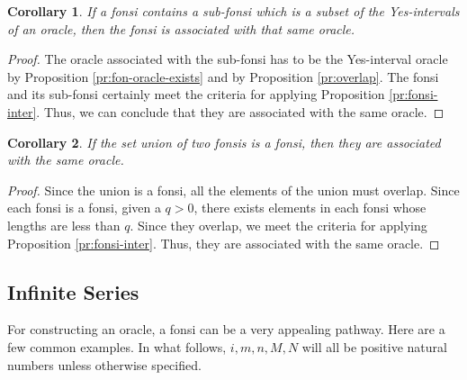 \documentclass[12pt]{article}
\newtheorem{corollary}{Corollary}[subsection]
\begin{document}
\begin{corollary}\label{cor:sub-fonsi}
    If a fonsi contains a sub-fonsi which is a subset of the Yes-intervals of an oracle, then the fonsi is associated with that same oracle. 
\end{corollary}

\begin{proof}
    The oracle associated with the sub-fonsi has to be the Yes-interval oracle by Proposition \ref{pr:fon-oracle-exists} and by Proposition \ref{pr:overlap}. The fonsi and its sub-fonsi certainly meet the criteria for applying Proposition \ref{pr:fonsi-inter}. Thus, we can conclude that they are associated with the same oracle. 
\end{proof}

\begin{corollary}
    If the set union of two fonsis is a fonsi, then they are associated with the same oracle.
\end{corollary}

\begin{proof}
    Since the union is a fonsi, all the elements of the union must overlap. Since each fonsi is a fonsi, given a $q > 0$, there exists elements in each fonsi whose lengths are less than $q$. Since they overlap, we meet the criteria for applying Proposition \ref{pr:fonsi-inter}. Thus, they are associated with the same oracle. 
\end{proof}


\subsection{Infinite Series}

For constructing an oracle, a fonsi can be a very appealing pathway.  Here are a few common examples. In what follows, $i, m, n, M, N$ will all be positive natural numbers unless otherwise specified.
\end{document}
